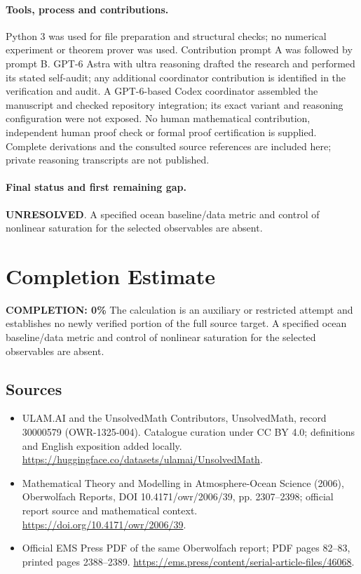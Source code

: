 \documentclass[11pt]{article}
\begin{document}
\paragraph{Tools, process and contributions.}
Python 3 was used for file preparation and structural checks; no numerical experiment or theorem prover was used. Contribution prompt A was followed by prompt B. GPT-6 Astra with ultra reasoning drafted the research and performed its stated self-audit; any additional coordinator contribution is identified in the verification and audit. A GPT-6-based Codex coordinator assembled the manuscript and checked repository integration; its exact variant and reasoning configuration were not exposed. No human mathematical contribution, independent human proof check or formal proof certification is supplied. Complete derivations and the consulted source references are included here; private reasoning transcripts are not published.

\paragraph{Final status and first remaining gap.}
\textbf{UNRESOLVED}. A specified ocean baseline/data metric and control of nonlinear saturation for the selected observables are absent.

\section{Completion Estimate}
\noindent\textbf{COMPLETION: 0\%}
The calculation is an auxiliary or restricted attempt and establishes no newly verified portion of the full source target. A specified ocean baseline/data metric and control of nonlinear saturation for the selected observables are absent.

\subsection{Sources}
\begin{itemize}
\item[\hypertarget{source:30000579:1}{S1}] ULAM.AI and the UnsolvedMath Contributors, UnsolvedMath, record 30000579 (OWR-1325-004). Catalogue curation under CC BY 4.0; definitions and English exposition added locally.
\url{https://huggingface.co/datasets/ulamai/UnsolvedMath}.
\item[\hypertarget{source:30000579:2}{S2}] Mathematical Theory and Modelling in Atmosphere-Ocean Science (2006), Oberwolfach Reports, DOI 10.4171/owr/2006/39, pp. 2307--2398; official report source and mathematical context.
\url{https://doi.org/10.4171/owr/2006/39}.
\item[\hypertarget{source:30000579:3}{S3}] Official EMS Press PDF of the same Oberwolfach report; PDF pages 82--83, printed pages 2388--2389.
\url{https://ems.press/content/serial-article-files/46068}.
\end{itemize}
\label{end:30000579}
\end{document}
